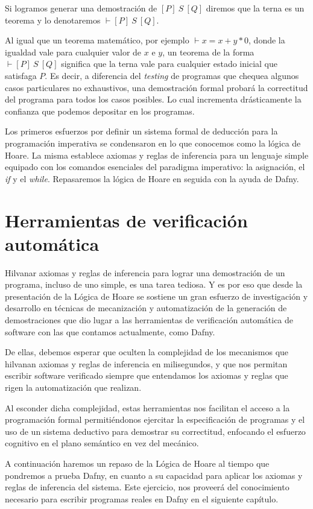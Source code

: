 \documentclass[12pt, a4paper, openany, fleqn]{book}
\newcommand{\hoare}[3]{\ensuremath{[#1]\ #2\ [#3]}}
\newcommand{\hoareTheorem}[3]{\ensuremath{\vdash[#1]\ #2\ [#3]}}
\begin{document}
    Si logramos generar una demostración de \hoare{P}{S}{Q} diremos que la terna es un teorema y lo denotaremos \hoareTheorem{P}{S}{Q}.

    Al igual que un teorema matemático, por ejemplo $\vdash x = x + y * 0$, donde la igualdad vale para cualquier valor de $x$ e $y$, un teorema de la forma \hoareTheorem{P}{S}{Q} significa que la terna vale para cualquier estado inicial que satisfaga $P$. Es decir, a diferencia del \textit{testing} de programas que chequea algunos casos particulares no exhaustivos, una demostración formal probará la correctitud del programa para todos los casos posibles. Lo cual incrementa drásticamente la confianza que podemos depositar en los programas.

    Los primeros esfuerzos por definir un sistema formal de deducción para la programación imperativa se condensaron en lo que conocemos como la lógica de Hoare.
    La misma establece axiomas y reglas de inferencia para un lenguaje simple equipado con los comandos esenciales del paradigma imperativo: la asignación, el \textit{if} y el \textit{while}. Repasaremos la lógica de Hoare en seguida con la ayuda de Dafny.

    \section{Herramientas de verificación automática}
    Hilvanar axiomas y reglas de inferencia para lograr una demostración de un programa, incluso de uno simple, es una tarea tediosa. Y es por eso que desde la presentación de la Lógica de Hoare se sostiene un gran esfuerzo de investigación y desarrollo en técnicas de mecanización y automatización de la generación de demostraciones que dio lugar a las herramientas de verificación automática de software con las que contamos actualmente, como Dafny.

    De ellas, debemos esperar que oculten la complejidad de los mecanismos que hilvanan axiomas y reglas de inferencia en milisegundos, y que nos permitan escribir software verificado siempre que entendamos los axiomas y reglas que rigen la automatización que realizan.

    Al esconder dicha complejidad, estas herramientas nos facilitan el acceso a la programación formal permitiéndonos ejercitar la especificación de programas y el uso de un sistema deductivo para demostrar su correctitud, enfocando el esfuerzo cognitivo en el plano semántico en vez del mecánico.

    A continuación haremos un repaso de la Lógica de Hoare al tiempo que pondremos a prueba Dafny, en cuanto a su capacidad para aplicar los axiomas y reglas de inferencia del sistema. Este ejercicio, nos proveerá del conocimiento necesario para escribir programas reales en Dafny en el siguiente capítulo.
\end{document}
